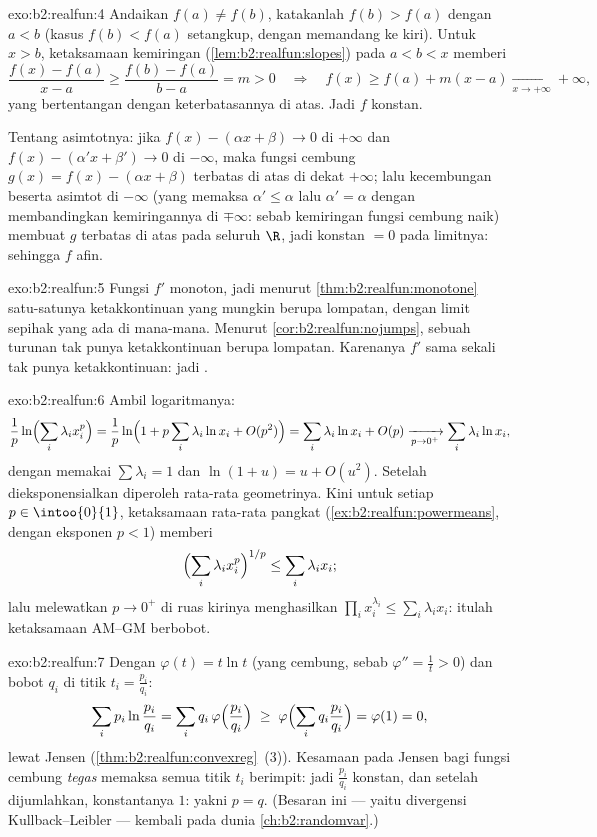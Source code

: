 \begin{solution}{exo:b2:realfun:4}
Andaikan $f(a) \neq f(b)$, katakanlah $f(b) > f(a)$ dengan $a < b$
(kasus $f(b) < f(a)$ setangkup, dengan memandang ke kiri). Untuk $x > b$,
ketaksamaan kemiringan (\cref{lem:b2:realfun:slopes}) pada $a < b < x$ memberi
\[
\frac{f(x) - f(a)}{x - a} \geq \frac{f(b) - f(a)}{b - a} = m > 0
\quad\Longrightarrow\quad
f(x) \geq f(a) + m(x - a) \xrightarrow[x\to+\infty]{} +\infty,
\]
yang bertentangan dengan keterbatasannya di atas. Jadi $f$ konstan.

Tentang asimtotnya: jika $f(x) - (\alpha x + \beta) \to 0$ di $+\infty$
dan $f(x) - (\alpha' x + \beta') \to 0$ di $-\infty$, maka fungsi
cembung $g(x) = f(x) - (\alpha x + \beta)$ terbatas di atas di dekat
$+\infty$; lalu kecembungan beserta asimtot di $-\infty$ (yang memaksa
$\alpha' \leq \alpha$ lalu $\alpha' = \alpha$ dengan membandingkan
kemiringannya di $\mp\infty$: sebab kemiringan fungsi cembung naik)
membuat $g$ terbatas di atas pada seluruh $\R$, jadi konstan $= 0$ pada
limitnya: sehingga $f$ afin.
\end{solution}

\begin{solution}{exo:b2:realfun:5}
Fungsi $f'$ monoton, jadi menurut \cref{thm:b2:realfun:monotone}
satu-satunya ketakkontinuan yang mungkin berupa lompatan, dengan limit
sepihak yang ada di mana-mana. Menurut \cref{cor:b2:realfun:nojumps},
sebuah turunan tak punya ketakkontinuan berupa lompatan. Karenanya $f'$
sama sekali tak punya ketakkontinuan: jadi .
\end{solution}

\begin{solution}{exo:b2:realfun:6}
Ambil logaritmanya:
\[
\frac1p \ln\Bigl(\sum_i \lambda_i x_i^p\Bigr)
= \frac1p \ln\Bigl(1 + p\sum_i \lambda_i \ln x_i +
O(p^2)\Bigr)
= \sum_i \lambda_i \ln x_i + O(p)
\xrightarrow[p \to 0^+]{} \sum_i \lambda_i \ln x_i ,
\]
dengan memakai $\sum\lambda_i = 1$ dan $\ln(1 + u) = u + O(u^2)$.
Setelah dieksponensialkan diperoleh rata-rata geometrinya. Kini untuk
setiap $p \in \intoo{0}{1}$, ketaksamaan rata-rata pangkat
(\cref{ex:b2:realfun:powermeans}, dengan eksponen $p < 1$) memberi
\[
\Bigl(\sum_i \lambda_i x_i^p\Bigr)^{1/p} \leq \sum_i\lambda_i x_i ;
\]
lalu melewatkan $p \to 0^+$ di ruas kirinya menghasilkan $\prod_i
x_i^{\lambda_i} \leq \sum_i \lambda_i x_i$: itulah ketaksamaan AM--GM berbobot.
\end{solution}

\begin{solution}{exo:b2:realfun:7}
Dengan $\varphi(t) = t\ln t$ (yang cembung, sebab $\varphi'' = \frac1t >
0$) dan bobot $q_i$ di titik $t_i = \frac{p_i}{q_i}$:
\[
\sum_i p_i \ln\frac{p_i}{q_i}
= \sum_i q_i\, \varphi\Bigl(\frac{p_i}{q_i}\Bigr)
\;\geq\; \varphi\Bigl(\sum_i q_i \frac{p_i}{q_i}\Bigr)
= \varphi(1) = 0 ,
\]
lewat Jensen (\cref{thm:b2:realfun:convexreg}~(3)). Kesamaan pada
Jensen bagi fungsi cembung \emph{tegas} memaksa semua titik
$t_i$ berimpit: jadi $\frac{p_i}{q_i}$ konstan, dan setelah dijumlahkan,
konstantanya $1$: yakni $p = q$. (Besaran ini --- yaitu divergensi
Kullback--Leibler --- kembali pada dunia \cref{ch:b2:randomvar}.)
\end{solution}

